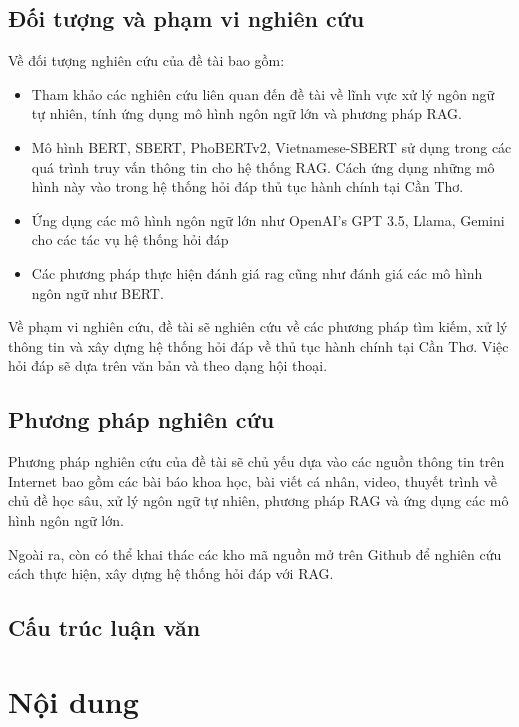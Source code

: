 \documentclass[a4paper, 12pt, openany]{book}
\begin{document}
\section{Đối tượng và phạm vi nghiên cứu}

Về đối tượng nghiên cứu của đề tài bao gồm:
\begin{itemize}
    \item Tham khảo các nghiên cứu liên quan đến đề tài về lĩnh vực xử lý ngôn ngữ tự nhiên, tính ứng dụng mô hình ngôn ngữ lớn và phương pháp RAG.
    \item Mô hình BERT, SBERT, PhoBERTv2, Vietnamese-SBERT sử dụng trong các quá trình truy vấn thông tin cho hệ thống RAG. Cách ứng dụng những mô hình này vào trong hệ thống hỏi đáp thủ tục hành chính tại Cần Thơ.
    \item Ứng dụng các mô hình ngôn ngữ lớn như OpenAI's GPT 3.5, Llama, Gemini cho các tác vụ hệ thống hỏi đáp
    \item Các phương pháp thực hiện đánh giá \acl{rag} cũng như đánh giá các mô hình ngôn ngữ như BERT.
\end{itemize}

Về phạm vi nghiên cứu, đề tài sẽ nghiên cứu về các phương pháp tìm kiếm, xử lý thông tin và
xây dựng hệ thống hỏi đáp về thủ tục hành chính tại Cần Thơ. Việc hỏi đáp sẽ dựa trên văn bản 
và theo dạng hội thoại.

\section{Phương pháp nghiên cứu}

Phương pháp nghiên cứu của đề tài sẽ chủ yếu dựa vào các nguồn thông tin trên Internet bao gồm các bài báo khoa học,
bài viết cá nhân, video, thuyết trình về chủ đề học sâu, xử lý ngôn ngữ tự nhiên, phương pháp RAG và ứng dụng các mô hình ngôn ngữ lớn.

Ngoài ra, còn có thể khai thác các kho mã nguồn mở trên Github để nghiên cứu cách thực hiện, xây dựng hệ thống hỏi đáp với RAG.

\section{Cấu trúc luận văn}


\chapter{Nội dung}
\end{document}
